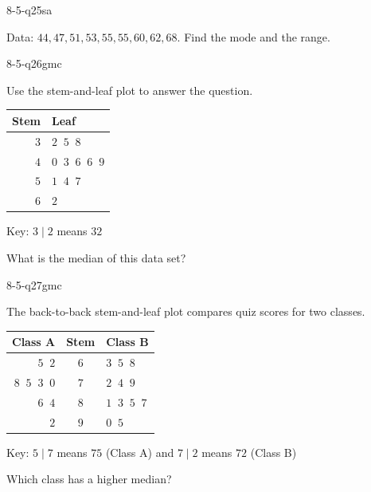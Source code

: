 \begin{practiceQuestion}{8-5-q25}{sa}
\begin{questionText}
Data: $44, 47, 51, 53, 55, 55, 60, 62, 68$. Find the mode and the range.
\end{questionText}
\end{practiceQuestion}


\begin{practiceQuestion}{8-5-q26}{gmc}
\begin{questionText}
Use the stem-and-leaf plot to answer the question.

\begin{center}
\begin{tabular}{r|l}
\textbf{Stem} & \textbf{Leaf} \\
\hline
$3$ & $2\;\;5\;\;8$ \\
$4$ & $0\;\;3\;\;6\;\;6\;\;9$ \\
$5$ & $1\;\;4\;\;7$ \\
$6$ & $2$
\end{tabular}

Key: $3 \mid 2$ means $32$
\end{center}

What is the median of this data set?
\end{questionText}
\end{practiceQuestion}

\begin{practiceQuestion}{8-5-q27}{gmc}
\begin{questionText}
The back-to-back stem-and-leaf plot compares quiz scores for two classes.

\begin{center}
\begin{tabular}{r|c|l}
\textbf{Class A} & \textbf{Stem} & \textbf{Class B} \\
\hline
$5\;\;2$ & $6$ & $3\;\;5\;\;8$ \\
$8\;\;5\;\;3\;\;0$ & $7$ & $2\;\;4\;\;9$ \\
$6\;\;4$ & $8$ & $1\;\;3\;\;5\;\;7$ \\
$2$ & $9$ & $0\;\;5$
\end{tabular}

Key: $5 \mid 7$ means $75$ (Class A) and $7 \mid 2$ means $72$ (Class B)
\end{center}

Which class has a higher median?
\end{questionText}
\end{practiceQuestion}

